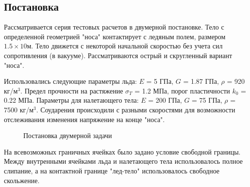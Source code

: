 \documentclass[12pt,a4paper, titlepage, openany]{book}
\begin{document}
\subsection{Постановка}
\par
Рассматривается серия тестовых расчетов в двумерной постановке. Тело с определенной геометрией "носа" контактирует с ледяным полем, размером $1.5 \times 10$м. Тело движется с некоторой начальной скоростью без учета сил сопротивления (в вакууме). Рассматриваются острый и скругленный вариант "носа".
\par
Использовались следующие параметры льда: $E$ = 5 ГПа, $G$ = 1.87 ГПа, $\rho$ = 920 кг/м$^3$. Предел прочности на растяжение $\sigma_T$ = 1.2 МПа, порог пластичности $k_0$ = 0.22 МПа. Параметры для налетающего тела: $E$ = 200 ГПа, $G$ = 75 ГПа, $\rho$ = 7500 кг/м$^3$. Соударения происходили с разными скоростями для возможности отслеживания изменения напряжение на конце "носа". 
\begin{figure}[h]
\begin{minipage}[h]{0.5\linewidth}
\end{minipage}
\hfill
\begin{minipage}[h]{0.5\linewidth}
\end{minipage}
\caption{Постановка двумерной задачи}
\label{ris:image1}
\end{figure}
\par
На всевозможных граничных ячейках было задано условие свободной границы. Между внутренными ячейками льда и налетающего тела использовалось полное слипание, а на контактной границе "лед-тело" использовалось свободное скольжение. 
\end{document}
